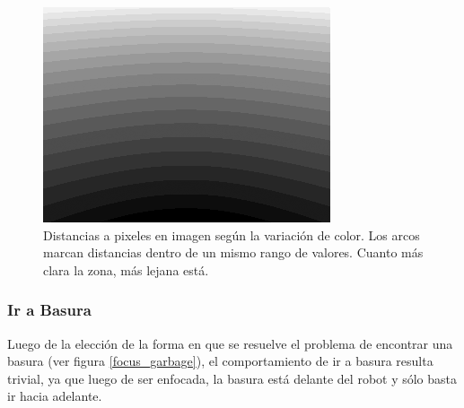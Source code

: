 \begin{figure}[htp]
\begin{center}
\includegraphics[scale=1]{comportamientos/figures/distancias.png}
\caption[Distancias a pixeles en imagen]
		{Distancias a pixeles en imagen seg\'un la variaci\'on de color.
		Los arcos marcan distancias dentro de un mismo rango de valores.
		Cuanto m\'as clara la zona, m\'as lejana est\'a.}
\label{fig:distancias_imagen}
\end{center}
\end{figure}

\subsubsection{Ir a Basura}
\label{go_to_garbage}
Luego de la elecci\'on de la forma en que se resuelve el problema de encontrar
una basura (ver figura \ref{focus_garbage}), el comportamiento de ir a basura
resulta trivial, ya que luego de ser enfocada, la basura est\'a delante del
robot y s\'olo basta ir hacia adelante.


